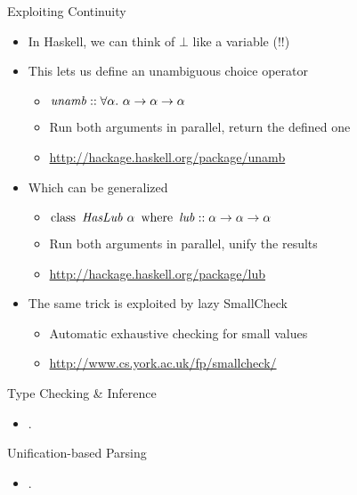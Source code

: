\documentclass[pdf,fyma2]{prosper} %
\newcommand{\opr}[1]{\ensuremath{\operatorname{#1}}}
\newcommand{\var}[1]{\ensuremath{\text{\textrm{\textit{#1}}}}}
\begin{document}
\begin{slide}{Exploiting Continuity}
	\vspace{1em}
	\begin{itemize}
	\item In Haskell, we can think of $\bot$ like a variable (!!)
	\vspace{1em}
	\item This lets us define an unambiguous choice operator
    	\begin{itemize}
    	\item $\var{unamb} :: \forall\alpha.~ \alpha \to \alpha \to \alpha$
    	\item Run both arguments in parallel, return the defined one
        \item \url{http://hackage.haskell.org/package/unamb}
    	\end{itemize}
    \item Which can be generalized
    	\begin{itemize}
    	\item $\opr{class}~ \var{HasLub}~\alpha ~\opr{where}~ \var{lub} :: \alpha \to \alpha \to \alpha$
    	\item Run both arguments in parallel, unify the results
        \item \url{http://hackage.haskell.org/package/lub}
    	\end{itemize}
	\vspace{1em}
	\item The same trick is exploited by lazy SmallCheck
    	\begin{itemize}
    	\item Automatic exhaustive checking for small values
    	\item \url{http://www.cs.york.ac.uk/fp/smallcheck/}
    	\end{itemize}
	\end{itemize}
\end{slide}

\begin{slide}{Type Checking \& Inference}
	\vspace{1em}
	\begin{itemize}
	\item .
	\end{itemize}
\end{slide}

\begin{slide}{Unification-based Parsing}
	\vspace{1em}
	\begin{itemize}
	\item .
	\end{itemize}
\end{slide}
\end{document}
